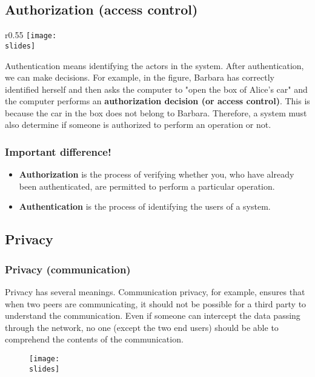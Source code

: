 \subsection{Authorization (access control)}
\begin{wrapfigure}{r}{0.55\textwidth}
  \centering
  \texttt{[image: \\slides]}
\end{wrapfigure}
Authentication means identifying the actors in the system. After authentication, we can make decisions. For example, in the figure, Barbara has correctly identified herself and then asks the computer to "open the box of Alice's car" and the computer performs an \textbf{authorization decision (or access control)}. This is because the car in the box does not belong to Barbara. Therefore, a system must also determine if someone is authorized to perform an operation or not.

\subsubsection*{Important difference!}
\begin{itemize}
  \item \textbf{Authorization} is the process of verifying whether you, who have already been authenticated, are permitted to perform a particular operation.
  \item \textbf{Authentication} is the process of identifying the users of a system.
\end{itemize}


\subsection{Privacy}
\subsubsection*{Privacy (communication)}
Privacy has several meanings.
Communication privacy, for example, ensures that when two peers are communicating, it should not be possible for a third party to understand the communication.
Even if someone can intercept the data passing through the network, no one (except the two end users) should be able to comprehend the contents of the communication.
\begin{figure}[h]
  \centering
  \texttt{[image: \\slides]}
\end{figure}


